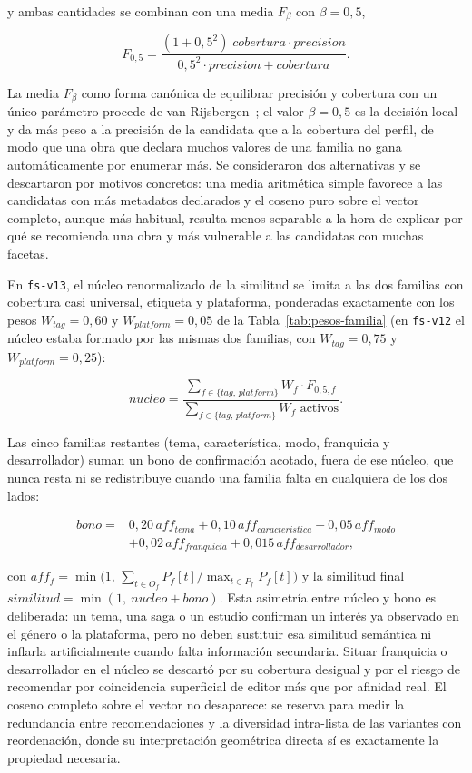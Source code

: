 y ambas cantidades se combinan con una media \(F_\beta\) con \(\beta = 0{,}5\),

\begin{equation}\label{eq:fbeta}
F_{0{,}5} = \frac{(1+0{,}5^2)\;cobertura \cdot precision}{0{,}5^2 \cdot precision + cobertura} .
\end{equation}

La media \(F_\beta\) como forma canónica de equilibrar precisión y cobertura con un único
parámetro procede de van Rijsbergen~\cite{vanrijsbergen1979information}; el valor
\(\beta = 0{,}5\) es la decisión local y da más peso a la precisión de la candidata que a la
cobertura del perfil, de modo que una obra que declara muchos valores de una familia no gana
automáticamente por enumerar más. Se consideraron dos alternativas y se descartaron por
motivos concretos: una media aritmética simple favorece a las candidatas con más metadatos
declarados y el coseno puro sobre el vector completo, aunque más habitual, resulta menos
separable a la hora de explicar por qué se recomienda una obra y más vulnerable a las
candidatas con muchas facetas.

En \texttt{fs-v13}, el núcleo renormalizado de la similitud se limita a las dos familias con
cobertura casi universal, etiqueta y plataforma, ponderadas exactamente con los pesos
\(W_{tag}=0{,}60\) y \(W_{platform}=0{,}05\) de la Tabla~\ref{tab:pesos-familia} (en
\texttt{fs-v12} el núcleo estaba formado por las mismas dos familias, con \(W_{tag}=0{,}75\) y
\(W_{platform}=0{,}25\)):

\[
nucleo = \frac{\sum_{f \in \{tag,\,platform\}} W_f \cdot F_{0{,}5,f}}{\sum_{f \in \{tag,\,platform\}} W_f \text{ activos}} .
\]

Las cinco familias restantes (tema, característica, modo, franquicia y desarrollador) suman
un bono de confirmación acotado, fuera de ese núcleo, que nunca resta ni se redistribuye
cuando una familia falta en cualquiera de los dos lados:

\begin{equation}\label{eq:bonus}
\begin{split}
bono ={}& 0{,}20\,aff_{tema} + 0{,}10\,aff_{caracteristica} + 0{,}05\,aff_{modo}\\
      &+ 0{,}02\,aff_{franquicia} + 0{,}015\,aff_{desarrollador} ,
\end{split}
\end{equation}

con \(aff_f = \min\!\big(1,\, \sum_{t \in O_f} P_f[t] / \max_{t \in P_f} P_f[t]\big)\) y la
similitud final \(similitud = \min(1,\ nucleo + bono)\). Esta asimetría entre núcleo y bono es
deliberada: un tema, una saga o un estudio confirman un interés ya observado en el género o la
plataforma, pero no deben sustituir esa similitud semántica ni inflarla artificialmente cuando
falta información secundaria. Situar franquicia o desarrollador en el núcleo se descartó por su
cobertura desigual y por el riesgo de recomendar por coincidencia superficial de editor más que
por afinidad real. El coseno completo sobre el vector no desaparece: se reserva para medir la
redundancia entre recomendaciones y la diversidad intra-lista de las variantes con
reordenación, donde su interpretación geométrica directa sí es exactamente la propiedad
necesaria.

